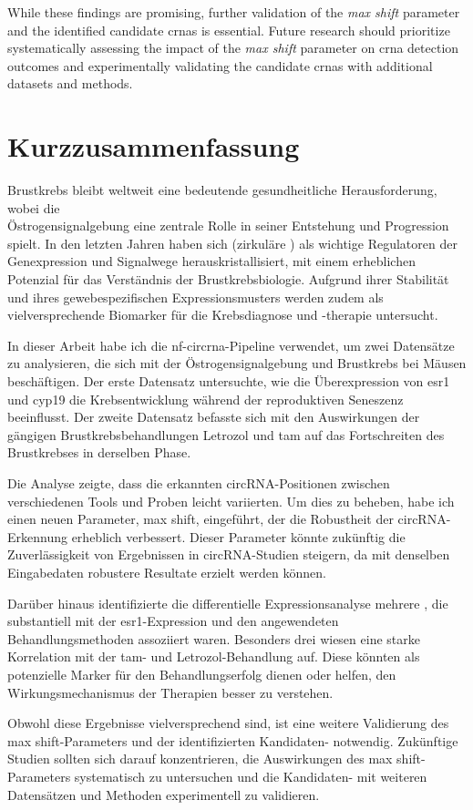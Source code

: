 While these findings are promising, further validation of the \textit{max
    shift} parameter and the identified candidate \glspl{crna} is essential.
Future research should prioritize systematically assessing the impact of the
\textit{max shift} parameter on \gls{crna} detection outcomes and
experimentally validating the candidate \glspl{crna} with additional datasets
and methods.

\newpage

\section{Kurzzusammenfassung}

Brustkrebs bleibt weltweit eine bedeutende gesundheitliche Herausforderung,
wobei die \\Östrogensignalgebung eine zentrale Rolle in seiner Entstehung und
Progression spielt.
In den letzten Jahren haben sich  (zirkuläre
) als wichtige Regulatoren der Genexpression und Signalwege
herauskristallisiert, mit einem erheblichen Potenzial für das Verständnis der
Brustkrebsbiologie.
Aufgrund ihrer Stabilität und ihres gewebespezifischen Expressionsmusters
werden  zudem als vielversprechende Biomarker für die
Krebsdiagnose und -therapie untersucht.

In dieser Arbeit habe ich die \gls{nf-circrna}-Pipeline verwendet, um zwei
Datensätze zu analysieren, die sich mit der Östrogensignalgebung und Brustkrebs
bei Mäusen beschäftigen.
Der erste Datensatz untersuchte, wie die Überexpression von \Gls{esr1} und
\Gls{cyp19} die Krebsentwicklung während der reproduktiven Seneszenz
beeinflusst.
Der zweite Datensatz befasste sich mit den Auswirkungen der gängigen
Brustkrebsbehandlungen Letrozol und \Gls{tam} auf das Fortschreiten des
Brustkrebses in derselben Phase.

Die Analyse zeigte, dass die erkannten circRNA-Positionen zwischen
verschiedenen Tools und Proben leicht variierten.
Um dies zu beheben, habe ich einen neuen Parameter, max shift, eingeführt, der
die Robustheit der circRNA-Erkennung erheblich verbessert.
Dieser Parameter könnte zukünftig die Zuverlässigkeit von Ergebnissen in
circRNA-Studien steigern, da mit denselben Eingabedaten robustere Resultate
erzielt werden können.

Darüber hinaus identifizierte die differentielle Expressionsanalyse mehrere
, die substantiell mit der \gls{esr1}-Expression und den
angewendeten Behandlungsmethoden assoziiert waren.
Besonders drei  wiesen eine starke Korrelation mit der
\Gls{tam}- und Letrozol-Behandlung auf.
Diese  könnten als potenzielle Marker für den
Behandlungserfolg dienen oder helfen, den Wirkungsmechanismus der Therapien
besser zu verstehen.

Obwohl diese Ergebnisse vielversprechend sind, ist eine weitere Validierung des
max shift-Parameters und der identifizierten Kandidaten-
notwendig.
Zukünftige Studien sollten sich darauf konzentrieren, die Auswirkungen des max
shift-Parameters systematisch zu untersuchen und die
Kandidaten- mit weiteren Datensätzen und Methoden
experimentell zu validieren.
